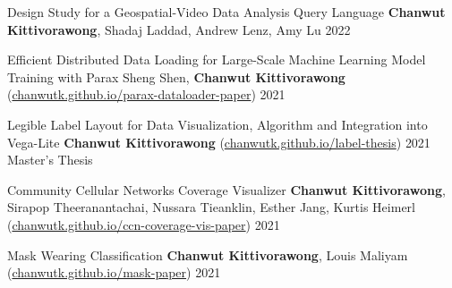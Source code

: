 

\begin{cvpubs}

  \cvpub
    {Design Study for a Geospatial-Video Data Analysis Query Language} %
    {\textbf{Chanwut Kittivorawong}, Shadaj Laddad, Andrew Lenz, Amy Lu} %
    {2022} %
    {} %

  \cvpub
    {Efficient Distributed Data Loading for Large-Scale Machine Learning Model Training with Parax} %
    {Sheng Shen, \textbf{Chanwut Kittivorawong} (\href{https://chanwutk.github.io/parax-dataloader-paper}{chanwutk.github.io/parax-dataloader-paper})} %
    {2021} %
    {} %

  \cvpub
    {Legible Label Layout for Data Visualization, Algorithm and Integration into Vega-Lite} %
    {\textbf{Chanwut Kittivorawong} (\href{https://chanwutk.github.io/label-thesis}{chanwutk.github.io/label-thesis})} %
    {2021} %
    {Master's Thesis} %

  \cvpub
    {Community Cellular Networks Coverage Visualizer} %
    {\textbf{Chanwut Kittivorawong}, Sirapop Theeranantachai, Nussara Tieanklin, Esther Jang, Kurtis Heimerl (\href{https://chanwutk.github.io/ccn-coverage-vis-paper}{chanwutk.github.io/ccn-coverage-vis-paper})} %
    {2021} %
    {} %

  \cvpub
    {Mask Wearing Classification} %
    {\textbf{Chanwut Kittivorawong}, Louis Maliyam (\href{https://chanwutk.github.io/mask-paper}{chanwutk.github.io/mask-paper})} %
    {2021} %
    {} %


\end{cvpubs}
